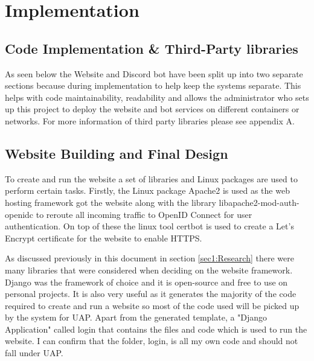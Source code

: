 \chapter{Implementation}

%
%

\section{Code Implementation \& Third-Party libraries}
As seen below the Website and Discord bot have been split up into two separate sections because during implementation to help keep the systems separate. This helps with code maintainability, readability and allows the administrator who sets up this project to deploy the website and bot services on different containers or networks. For more information of third party libraries please see appendix A.

\section{Website Building and Final Design}
To create and run the website a set of libraries and Linux packages are used to perform certain tasks. Firstly, the Linux package Apache2 \cite{apache2} is used as the web hosting framework got the website along with the library libapache2-mod-auth-openidc to reroute all incoming traffic to OpenID Connect \cite{OpenID} for user authentication. On top of these the linux tool certbot \cite{certbot} is used to create a Let's Encrypt certificate for the website to enable HTTPS. 

As discussed previously in this document in section \ref{sec1:Research} there were many libraries that were considered when deciding on the website framework. Django \cite{Django} was the framework of choice and it is open-source and free to use on personal projects. It is also very useful as it generates the majority of the code required to create and run a website so most of the code used will be picked up by the system for UAP. Apart from the generated template, a "Django Application" called login that contains the files and code which is used to run the website. I can confirm that the folder, login, is all my own code and should not fall under UAP.

